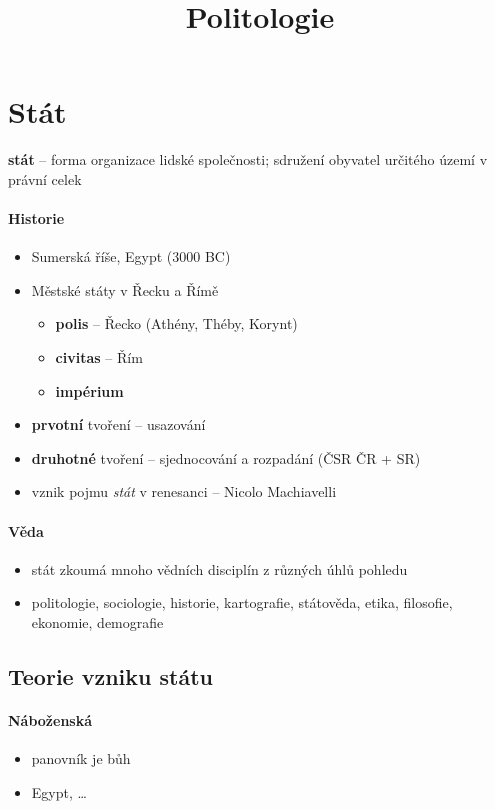 \title{Politologie}


\section{Stát}
\textbf{stát} -- forma organizace lidské společnosti; sdružení obyvatel určitého území v právní celek
\paragraph{Historie}
\begin{itemize}
\item Sumerská říše, Egypt (3000 BC)
\item Městské státy v Řecku a Římě
	\begin{itemize}
	\item \textbf{polis} -- Řecko (Athény, Théby, Korynt)
	\item \textbf{civitas} -- Řím 
	\item \textbf{impérium}
	\end{itemize}
\item \textbf{prvotní} tvoření -- usazování
\item \textbf{druhotné} tvoření -- sjednocování a rozpadání (ČSR \ra ČR + SR)
\item vznik pojmu \textit{stát} v renesanci  -- Nicolo Machiavelli

\end{itemize}

\paragraph{Věda}
\begin{itemize}
\item stát zkoumá mnoho vědních disciplín z různých úhlů pohledu
\item politologie, sociologie, historie, kartografie, státověda, etika, filosofie, ekonomie, demografie
\end{itemize}

\subsection{Teorie vzniku státu}
\paragraph{Náboženská}
\begin{itemize}
\item panovník je bůh
\item Egypt, \ldots
\end{itemize}

